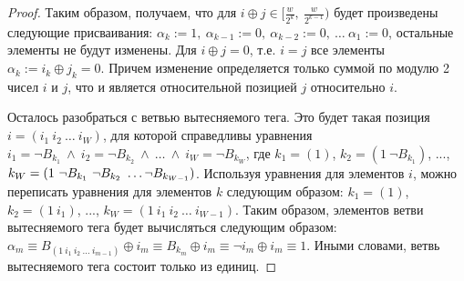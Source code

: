 \begin{proof}
  Таким образом, получаем, что для $i \oplus j \in
  [\frac{w}{2^k},~\frac{w}{2^{k-1}})$ будет произведены следующие
  присваивания: $\alpha_k := 1,~\alpha_{k-1} := 0,~\alpha_{k-2} :=
  0,~\dots~\alpha_1 := 0$, остальные элементы не будут изменены. Для
  $i \oplus j = 0$, т.е. $i = j$ все элементы $\alpha_k := i_k \oplus
  j_k = 0$. Причем изменение определяется только суммой по модулю 2
  чисел $i$ и $j$, что и является относительной позицией $j$
  относительно $i$.

  Осталось разобраться с ветвью вытесняемого тега. Это будет такая
  позиция $i = (i_1~i_2~\dots~i_W)$, для которой справедливы
  уравнения $i_1 = \neg B_{k_1}~\wedge~i_2 = \neg
  B_{k_2}~\wedge~\dots~\wedge~i_W = \neg B_{k_W}$, где $k_1 = (1)$,
  $k_2 = (1~\neg B_{k_1})$, ..., $k_W = (1~\neg B_{k_1}~\neg
  B_{k_2}~\dots\\\neg B_{k_{W-1}})$. Используя уравнения для
  элементов $i$, можно переписать уравнения для элементов $k$
  следующим образом: $k_1 = (1)$,
  $k_2 = (1~i_1)$, ..., $k_W = (1~i_1~i_2~\dots~i_{W-1})$. Таким
  образом, элементов ветви вытесняемого тега будет вычисляться
  следующим образом: $\alpha_m \equiv B_{(1~i_1~i_2~\dots~i_{m-1})}
  \oplus i_m \equiv B_{k_m} \oplus i_m \equiv \neg i_m \oplus i_m
  \equiv 1$. Иными словами, ветвь вытесняемого тега состоит только
  из единиц.
\end{proof}


